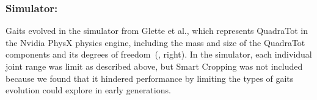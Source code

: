 
\subsubsection{Simulator:}
Gaits evolved in the simulator from Glette et al., which represents QuadraTot in the Nvidia PhysX physics engine\footnotemark[\value{footnote}], including the mass and size of the QuadraTot components and its degrees of freedom~(, right). In the simulator, each individual joint range was limit as described above, but Smart Cropping was not included because we found that it hindered performance by limiting the types of gaits evolution could explore in early generations. 


